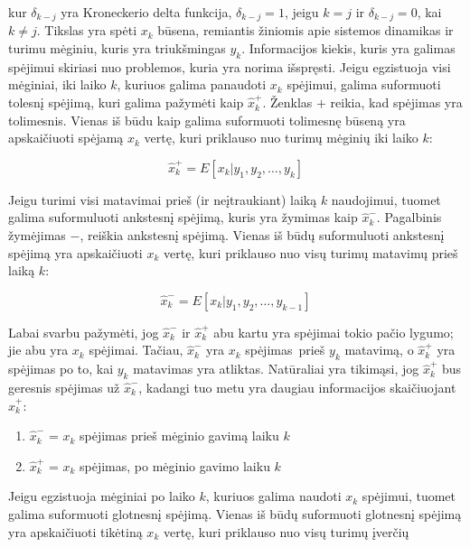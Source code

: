     kur $\delta_{k-j}$ yra Kroneckerio delta funkcija, $\delta_{k-j} = 1$, jeigu $k=j$ ir $\delta_{k-j} = 0$, kai $k \neq j$.
    Tikslas yra spėti $x_k$ būsena, remiantis žiniomis apie sistemos dinamikas ir turimu mėginiu, kuris yra triukšmingas ${y_k}$.
    Informacijos kiekis, kuris yra galimas spėjimui skiriasi nuo problemos, kuria yra norima išspręsti.
    Jeigu egzistuoja visi mėginiai, iki laiko $k$, kuriuos galima panaudoti $x_k$ spėjimui, galima suformuoti tolesnį spėjimą, kuri galima pažymėti kaip $\hat{x}_k^{+}$.
    Ženklas $+$ reikia, kad spėjimas yra tolimesnis.
    Vienas iš būdu kaip galima suformuoti tolimesnę būseną yra apskaičiuoti spėjamą $x_k$ vertę, kuri priklauso nuo turimų mėginių iki laiko $k$:

    \begin{equation}
        \hat{x}_k^{+} = E[x_k|y_1,y_2, \dots , y_k]
    \end{equation}

    Jeigu turimi visi matavimai prieš (ir neįtraukiant) laiką $k$ naudojimui, tuomet galima suformuluoti ankstesnį spėjimą, kuris yra žymimas kaip $\hat{x}_k^{-}$.
    Pagalbinis žymėjimas $-$, reiškia ankstesnį spėjimą.
    Vienas iš būdų suformuluoti ankstesnį spėjimą yra apskaičiuoti $x_k$ vertę, kuri priklauso nuo visų turimų matavimų prieš laiką $k$:

    \begin{equation}
        \hat{x}_k^{-} = E[x_k|y_1,y_2,\dots, y_{k-1}]
    \end{equation}

    Labai svarbu pažymėti, jog $\hat{x}^-_k$ ir $\hat{x}_k^{+}$ abu kartu yra spėjimai tokio pačio lygumo; jie abu yra $x_k$ spėjimai.
    Tačiau, $\hat{x}_k^-$ yra $x_k$ spėjimas prieš $y_k$ matavimą, o $\hat{x}_k^+$ yra spėjimas po to, kai $y_k$ matavimas yra atliktas.
    Natūraliai yra tikimąsi, jog $\hat{x}_k^+$ bus geresnis spėjimas už $\hat{x}_k^-$, kadangi tuo metu yra daugiau informacijos skaičiuojant $\hat{x}_k^+$:

    \begin{enumerate}
        \item $\hat{x}_k^-$ = $x_k$ spėjimas prieš mėginio gavimą laiku $k$
        \item $\hat{x}_k^+$ = $x_k$ spėjimas, po mėginio gavimo laiku $k$
    \end{enumerate}

    Jeigu egzistuoja mėginiai po laiko $k$, kuriuos galima naudoti $x_k$ spėjimui, tuomet galima suformuoti glotnesnį spėjimą.
    Vienas iš būdų suformuoti glotnesnį spėjimą yra apskaičiuoti tikėtiną $x_k$ vertę, kuri priklauso nuo visų turimų įverčių

